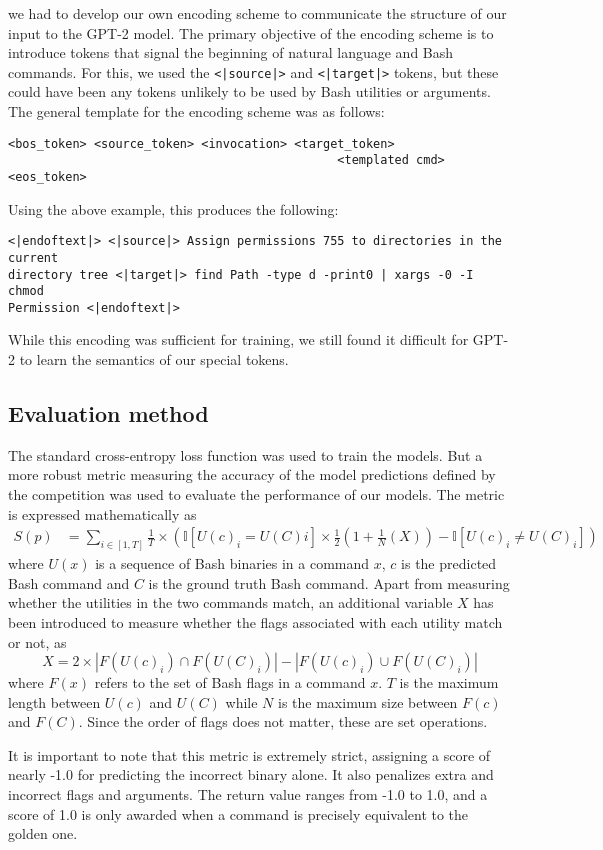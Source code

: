 we had to develop our own encoding scheme to communicate the structure of our
input to the GPT-2 model. The primary objective of the encoding scheme is to
introduce tokens that signal the beginning of natural language and Bash commands. For this, we used the \texttt{<|source|>} and \texttt{<|target|>} tokens, but these could have been any tokens unlikely to be used by Bash utilities or arguments. The general template for the encoding scheme was as follows:
\begin{verbatim}
<bos_token> <source_token> <invocation> <target_token>
                                              <templated cmd> <eos_token> 
\end{verbatim}
Using the above example, this produces the following:
\begin{verbatim}
<|endoftext|> <|source|> Assign permissions 755 to directories in the current
directory tree <|target|> find Path -type d -print0 | xargs -0 -I chmod 
Permission <|endoftext|>
\end{verbatim}
While this encoding was sufficient for training, we still found it difficult
for GPT-2 to learn the semantics of our special tokens.


\subsection{Evaluation method}
The standard cross-entropy loss function was used to train the models. But a
more robust metric measuring the accuracy of the model predictions defined by
the competition was used to evaluate the performance of our models. The metric
is expressed mathematically as
\begin{align*}
	S(p) & =\sum_{i\in[1,T]}\frac{1}{T}\times\left(
	\mathbb{I}[U(c)_i=U(C)i]\times\frac{1}{2}\left(
		1+\frac{1}{N}\left(X\right)\right) -\mathbb{I}[U(c)_i\ne U(C)_i]
	\right)
\end{align*}
where $U(x)$ is a sequence of Bash binaries in a command $x$, $c$ is the
predicted Bash command and $C$ is the ground truth Bash command. Apart from
measuring whether the utilities in the two commands match, an additional
variable $X$ has been introduced to measure whether the flags associated with
each utility match or not, as
\begin{equation*}
	X = 2\times
	|F(U(c)_i)\cap F(U(C)_i)| - |F(U(c)_i)\cup F(U(C)_i)|
\end{equation*}
where $F(x)$ refers to the set of Bash flags in a command $x$. $T$ is the
maximum length between $U(c)$ and $U(C)$ while $N$ is the maximum size between
$F(c)$ and $F(C)$. Since the order of flags does not matter, these are set
operations.
\par
It is important to note that this metric is extremely strict, assigning a score
of nearly -1.0 for predicting the incorrect binary alone. It also penalizes
extra and incorrect flags and arguments. The return value ranges from -1.0 to
1.0, and a score of 1.0 is only awarded when a command is precisely equivalent
to the golden one.
